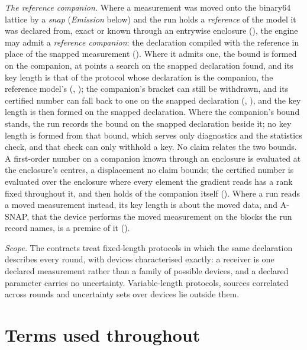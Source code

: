 \emph{The reference companion.} Where a measurement was moved onto the
binary64 lattice by a \emph{snap} (\emph{Emission} below) and the run holds
a \emph{reference} of the model it was declared from, exact or known through
an entrywise enclosure (), the engine
may admit a \emph{reference companion}: the declaration compiled with the
reference in place of the snapped measurement
(). Where it admits one, the bound
is formed on the companion, at points a search on the snapped declaration
found, and its key length is that of the protocol whose declaration is the
companion, the reference model's
(,
); the
companion's bracket can still be withdrawn, and its certified number can
fall back to one on the snapped declaration
(,
), and the key length
is then formed on the snapped declaration. Where the companion's bound
stands, the run records the bound on the snapped declaration beside it; no
key length is formed from that bound, which serves only diagnostics and the
statistics check, and that check can only withhold a key. No claim relates
the two bounds. A first-order number on a companion known through an
enclosure is
evaluated at the enclosure's centres, a displacement no claim bounds; the
certified number is evaluated over the enclosure where every element the
gradient reads has a rank fixed throughout it, and then holds of the
companion itself (). Where
a run reads a moved measurement instead, its key length is about the moved
data, and A-SNAP, that the device performs the moved measurement on the
blocks the run record names, is a premise of it
().

\emph{Scope.} The contracts treat fixed-length protocols in which the same
declaration describes every round, with devices characterised exactly: a
receiver is one declared measurement rather than a family of possible
devices, and a declared parameter carries no uncertainty. Variable-length
protocols, sources correlated across rounds and uncertainty sets over devices
lie outside them.

\section*{Terms used throughout}

